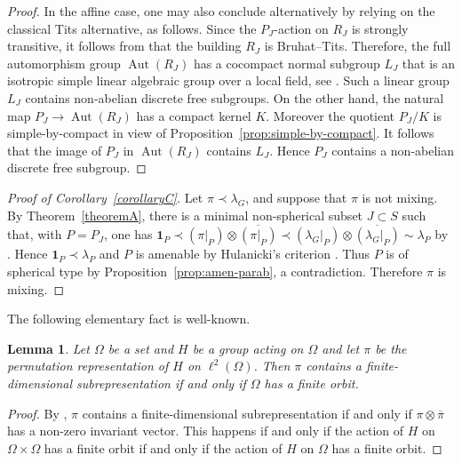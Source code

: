 \documentclass[12pt,a4paper]{amsproc}
\newtheorem{lemma}[theorem]{Lemma}
\theoremstyle{definition}
\DeclareMathOperator{\Aut}{Aut}
\newcommand{\one}{\mathbf 1}
\newcommand{\ol}[1]{\overline{#1}}
\newcommand{\weakcontain}{\prec}
\begin{document}
\begin{proof}
In the affine case, one may also conclude alternatively by relying on the classical Tits alternative, as follows. Since the $P_J$-action on $R_J$ is strongly transitive, it follows from \cite[Corollary~E]{CapMon_Bieberbach} that  the building $R_J$ is Bruhat--Tits.  Therefore, the full automorphism group $\Aut(R_J)$ has a cocompact normal subgroup $L_J$ that is an isotropic simple linear algebraic group over a local field, see   \cite[Proposition~9.1]{BCL}.  Such a linear group $L_J$ contains non-abelian discrete free subgroups. On the other hand, the natural map $P_J \to \Aut(R_J)$ has a compact kernel $K$. Moreover the quotient $P_J/K$ is simple-by-compact in view of Proposition~\ref{prop:simple-by-compact}. It follows that the image of $P_J$ in $ \Aut(R_J)$ contains $L_J$. Hence $P_J$ contains a non-abelian discrete free subgroup.
\end{proof}
	
	

\begin{proof}[Proof of Corollary~\ref{corollaryC}]
Let $\pi\weakcontain\lambda_G$, and suppose that $\pi$ is not  mixing. By Theorem~\ref{theoremA}, there is a minimal non-spherical subset $J\subset S$ such that, with $P=P_J$, one has $\one_P\weakcontain (\pi|_P)\otimes\ol{(\pi|_P)} \weakcontain (\lambda_G|_P) \otimes \ol{(\lambda_G|_P)} \sim \lambda_P$ by   \cite[Corollary~E.2.6(ii)]{BHV}. Hence $\one_P\weakcontain\lambda_P$ and  $P$ is amenable by Hulanicki's criterion \cite{Hulanicki}. Thus $P$ is of spherical type by Proposition~\ref{prop:amen-parab}, a contradiction. Therefore $\pi$ is mixing.
\end{proof}


The following elementary fact is well-known. 

\begin{lemma}\label{lem:fd}
Let $\Omega$ be a set and $H$ be a group acting on $\Omega$ and let $\pi$ be the permutation representation of $H$ on $\ell^2(\Omega)$. Then $\pi$ contains a   finite-dimensional subrepresentation if and only if $\Omega$ has a finite orbit. 
\end{lemma}
\begin{proof}
By \cite[Proposition~A.1.12]{BHV}, $\pi$ contains a finite-dimensional subrepresentation if and only if $\pi\otimes\ol\pi$ has a non-zero invariant vector. This happens if and only if the action of $H$ on $\Omega \times \Omega$ has a finite orbit if and only if the action of $H$ on $\Omega$ has a finite orbit.
\end{proof}
	
\end{document}
